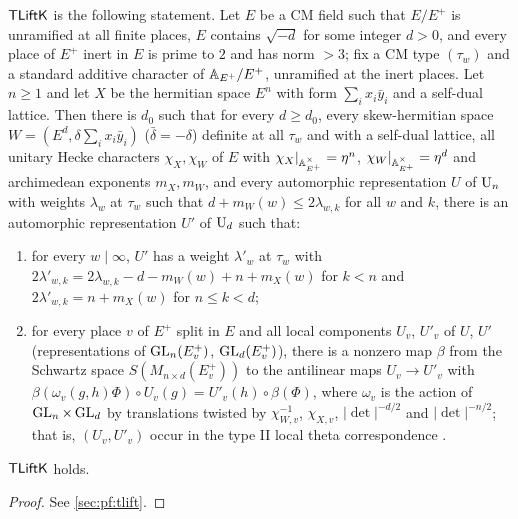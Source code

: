 \begin{definition}\label{def:galois:tliftk}
$\mathsf{TLiftK}$ is the following statement. Let $E$ be a CM field such that $E/E^+$ is unramified at
all finite places, $E$ contains $\sqrt{-d}$ for some integer $d>0$, and every place of $E^+$ inert in
$E$ is prime to $2$ and has norm $>3$; fix a CM type $(\tau_w)$ and a standard additive character of
$\mathbb{A}_{E^+}/E^+$, unramified at the inert places. Let $n\ge1$ and let $X$ be the hermitian space $E^n$
with form $\sum_ix_i\bar y_i$ and a self-dual lattice. Then there is $d_0$ such that for every $d\ge
d_0$, every skew-hermitian space $W=(E^d,\delta\sum_ix_i\bar y_i)$ ($\bar\delta=-\delta$) definite at all
$\tau_w$ and with a self-dual lattice, all unitary Hecke characters $\chi_X,\chi_W$ of $E$ with
$\chi_X|_{\mathbb{A}_{E^+}^\times}=\eta^n$, $\chi_W|_{\mathbb{A}_{E^+}^\times}=\eta^d$ and archimedean exponents
$m_X,m_W$, and every automorphic representation $U$ of $\mathrm{U}_n$ with weights $\lambda_w$ at $\tau_w$
such that $d+m_W(w)\le2\lambda_{w,k}$ for all $w$ and $k$, there is an automorphic representation
$U'$ of $\mathrm{U}_d$ such that:
\begin{enumerate}[label=(\roman*),nosep]
\item for every $w\mid\infty$, $U'$ has a weight $\lambda'_w$ at $\tau_w$ with
  $2\lambda'_{w,k}=2\lambda_{w,k}-d-m_W(w)+n+m_X(w)$ for $k<n$ and $2\lambda'_{w,k}=n+m_X(w)$ for $n\le k<d$;
\item for every place $v$ of $E^+$ split in $E$ and all local components $U_v$, $U'_v$ of $U$, $U'$
  (representations of $\operatorname{GL}_n(E^+_v)$, $\operatorname{GL}_d(E^+_v)$), there is a nonzero map $\beta$ from the
  Schwartz space $S(M_{n\times d}(E^+_v))$ to the antilinear maps $U_v\to U'_v$ with
  $\beta(\omega_v(g,h)\Phi)\circ U_v(g)=U'_v(h)\circ\beta(\Phi)$, where $\omega_v$ is the action of
  $\operatorname{GL}_n\times\operatorname{GL}_d$ by translations twisted by $\chi_{W,v}^{-1}$, $\chi_{X,v}$, $|\det|^{-d/2}$ and
  $|\det|^{-n/2}$; that is, $(U_v,U'_v)$ occur in the type II local theta correspondence
  \cite{Minguez2008}.
\end{enumerate}
\end{definition}

\begin{theorem}\Fmark\label{thm:galois:tlift}
$\mathsf{TLiftK}$ holds. 
\end{theorem}
\begin{proof}See \cref{sec:pf:tlift}.
\end{proof}


